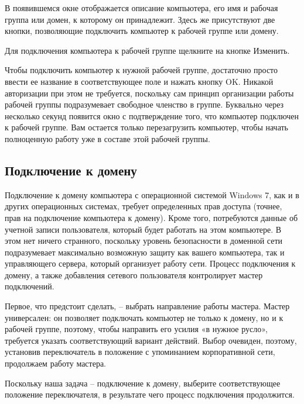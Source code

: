 В появившемся окне отображается описание компьютера, его имя и рабочая группа или домен, к которому он принадлежит. Здесь же присутствуют две кнопки, позволяющие подключить компьютер к рабочей группе или домену.\par\bigskip

Для подключения компьютера к рабочей группе щелкните на кнопке Изменить.\par\bigskip

Чтобы подключить компьютер к нужной рабочей группе, достаточно просто ввести ее название в соответствующее поле и нажать кнопку OK. Никакой авторизации при этом не требуется, поскольку сам принцип организации работы рабочей группы подразумевает свободное членство в группе. Буквально через несколько секунд появится окно с подтверждение того, что компьютер подключен к рабочей группе. Вам остается только перезагрузить компьютер, чтобы начать полноценную работу уже в составе этой рабочей группы.

\subsection{Подключение к домену}

Подключение к домену компьютера с операционной системой Windows 7, как и в других операционных системах, требует определенных прав доступа (точнее, прав на подключение компьютера к домену). Кроме того, потребуются данные об учетной записи пользователя, который будет работать на этом компьютере. В этом нет ничего странного, поскольку уровень безопасности в доменной сети подразумевает максимально возможную защиту как вашего компьютера, так и управляющего сервера, который организует работу сети. Процесс подключения к домену, а также добавления сетевого пользователя контролирует мастер подключений.\par\bigskip

Первое, что предстоит сделать, – выбрать направление работы мастера. Мастер универсален: он позволяет подключать компьютер не только к домену, но и к рабочей группе, поэтому, чтобы направить его усилия «в нужное русло», требуется указать соответствующий вариант действий. Выбор очевиден, поэтому, установив переключатель в положение с упоминанием корпоративной сети, продолжаем работу мастера.\par\bigskip

Поскольку наша задача – подключение к домену, выберите соответствующее положение переключателя, в результате чего процесс подключения продолжится.\par\bigskip

